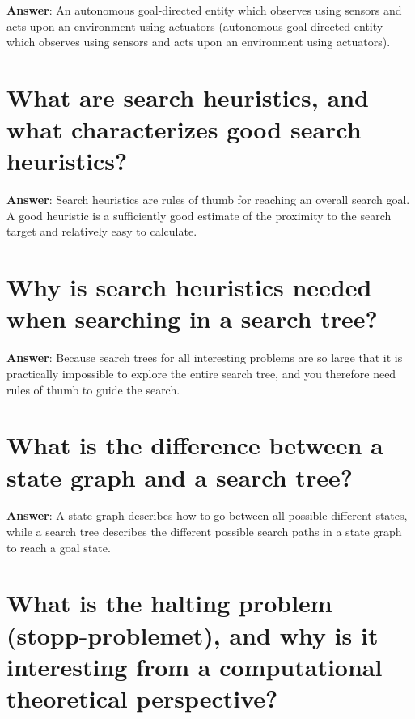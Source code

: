 \documentclass[a4paper,11pt,oneside]{book}
\begin{document}
\begin{sloppypar}
\label{q:327:sa:en:True}

\textbf{Answer}: An autonomous goal-directed entity which observes using sensors and acts upon an environment using actuators (autonomous goal-directed entity which observes using sensors and acts upon an environment using actuators).



\section{What are search heuristics, and what characterizes good search heuristics?}

\label{q:328:sa:en:True}

\textbf{Answer}: Search heuristics are rules of thumb for reaching an overall search goal. A good heuristic is a sufficiently good estimate of the proximity to the search target and relatively easy to calculate.



\section{Why is search heuristics needed when searching in a search tree?}

\label{q:329:sa:en:True}

\textbf{Answer}: Because search trees for all interesting problems are so large that it is practically impossible to explore the entire search tree, and you therefore need rules of thumb to guide the search.



\section{What is the difference between a state graph and a search tree?}

\label{q:330:sa:en:True}

\textbf{Answer}: A state graph describes how to go between all possible different states, while a search tree describes the different possible search paths in a state graph to reach a goal state.



\section{What is the halting problem (stopp-problemet), and why is it interesting from a computational theoretical perspective?}


\end{sloppypar}
\end{document}

